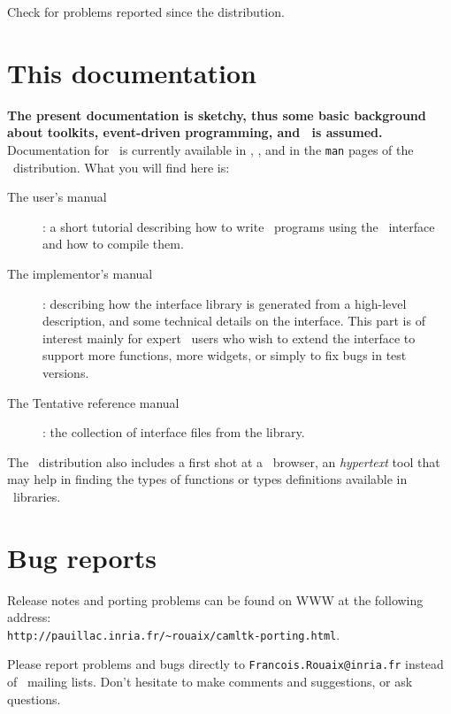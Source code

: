 \begin{htmlonly}
Check 
for problems reported since the distribution.
\end{htmlonly}

\section*{This documentation}

{\bf The present documentation is sketchy, thus some basic background
about toolkits, event-driven programming, and \tk\ is assumed.}
Documentation for \tk\ is currently available in \cite{ouster94},
\cite{welch95}, and in the {\tt man} pages of the \tk\ distribution.
What you will find here is:
\begin{description}
\item[The user's manual] : a short tutorial describing how to write \caml\
programs using the \tk\ interface and how to compile them. 
\item[The implementor's manual] : describing how the interface library is
generated from a high-level description, and some technical details on
the interface. This part is of interest mainly for
expert \tk\ users who wish to extend the interface to support more
functions, more widgets, or simply to fix bugs in test versions.
\item[The Tentative reference manual] : the collection of interface files
from the library.
\end{description}

The \camltk\ distribution also includes a first shot at a \caml\ browser,
an {\em hypertext} tool that may help in finding the types of functions or
types definitions available in \caml\ libraries.

\section*{Bug reports}

Release notes and porting problems can be found on WWW at the following
address:\\
\verb|http://pauillac.inria.fr/~rouaix/camltk-porting.html|.

Please report problems and bugs directly to \verb|Francois.Rouaix@inria.fr|
instead of \caml\ mailing lists.
Don't hesitate to make comments and suggestions, or ask questions.

